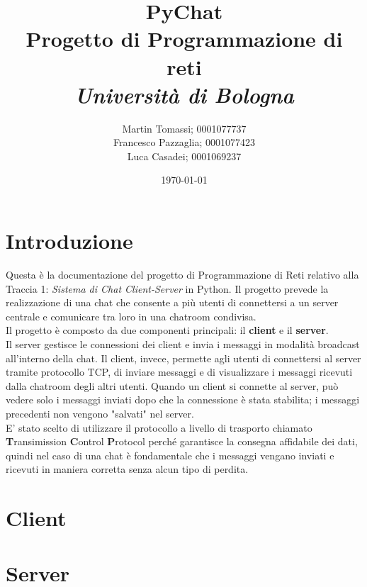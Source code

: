 \documentclass[a4paper,12pt]{report}
\title{\textbf{PyChat}\\Progetto di Programmazione di reti\\\textit{Università di Bologna}}
\author{Martin Tomassi; 0001077737\\Francesco Pazzaglia; 0001077423\\Luca Casadei; 0001069237}
\date{\today}
\begin{document}
\maketitle
\tableofcontents

\chapter{Introduzione}
Questa è la documentazione del progetto di Programmazione di Reti relativo alla Traccia 1: \textit{Sistema di Chat Client-Server} in Python. Il progetto prevede la realizzazione di una chat che consente a più utenti di connettersi a un server centrale e comunicare tra loro in una chatroom condivisa.\\
Il progetto è composto da due componenti principali: il \textbf{client} e il \textbf{server}.\\
Il server gestisce le connessioni dei client e invia i messaggi in modalità broadcast all'interno della chat. Il client, invece, permette agli utenti di connettersi al server tramite protocollo TCP, di inviare messaggi e di visualizzare i messaggi ricevuti dalla chatroom degli altri utenti. Quando un client si connette al server, può vedere solo i messaggi inviati dopo che la connessione è stata stabilita; i messaggi precedenti non vengono "salvati" nel server. \\
E' stato scelto di utilizzare il protocollo a livello di trasporto chiamato \textbf{T}ransimission \textbf{C}ontrol \textbf{P}rotocol perché garantisce la consegna affidabile dei dati, quindi nel caso di una chat è fondamentale che i messaggi vengano inviati e ricevuti in maniera corretta senza alcun tipo di perdita.

\chapter{Client}

\chapter{Server}
\end{document}
